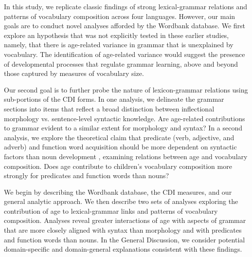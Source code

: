 \documentclass[10pt,letterpaper]{article}
\begin{document}

In this study, we replicate classic findings of strong lexical-grammar relations and patterns of vocabulary composition across four languages. However, our main goals are to conduct novel analyses afforded by the Wordbank database. We first explore an hypothesis that was not explicitly tested in these earlier studies, namely, that there is age-related variance in grammar that is unexplained by vocabulary. The identification of age-related variance would suggest the presence of developmental processes that regulate grammar learning, above and beyond those captured by measures of vocabulary size.

Our second goal is to further probe the nature of lexicon-grammar relations using sub-portions of the CDI forms. In one analysis, we delineate the grammar sections into items that reflect a broad distinction between inflectional morphology vs. sentence-level syntactic knowledge. Are age-related contributions to grammar evident to a similar extent for morphology and syntax?  In a second analysis, we explore the theoretical claim that predicate (verb, adjective, and adverb) and function word acquisition should be more dependent on syntactic factors than noun development \cite{gleitman1990}, examining relations between age and vocabulary composition. Does age contribute to children's vocabulary composition more strongly for predicates and function words than nouns? 



We begin by describing the Wordbank database, the CDI measures, and our general analytic approach. We then describe two sets of analyses exploring the contribution of age to lexical-grammar links and patterns of vocabulary composition.  Analyses reveal greater interactions of age with aspects of grammar that are more closely aligned with syntax than morphology and with predicates and function words than nouns. In the General Discussion, we consider potential domain-specific and domain-general explanations consistent with these findings. 
\end{document}
